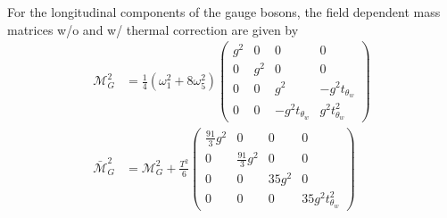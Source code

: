 \documentclass[12pt]{article}
\begin{document}
For the longitudinal components of the gauge bosons, the field dependent mass matrices w/o and w/ thermal correction are given by
\begin{subequations}
    \begin{align}
        \mathcal{M}_G^2 &= \frac{1}{4}(\omega_1^2+8\omega_5^2)\begin{pmatrix}
            g^2 & 0 & 0 & 0 \\
            0 & g^2 & 0 & 0 \\
            0 & 0 & g^2 & -g^2t_{\theta_w} \\
            0 & 0 & -g^2t_{\theta_w} & g^2t_{\theta_w}^2
        \end{pmatrix}\\
        \bar{\mathcal{M}}_G^2 &= \mathcal{M}_G^2 + \frac{T^2}{6}\begin{pmatrix}
        \frac{91}{3}g^2 & 0 & 0 & 0 \\
        0 & \frac{91}{3}g^2 & 0 & 0 \\
        0 & 0 & 35g^2 & 0 \\
        0 & 0 & 0 & 35g^2 t_{\theta_w}^2
        \end{pmatrix}
    \end{align}
\end{subequations}





\end{document}
